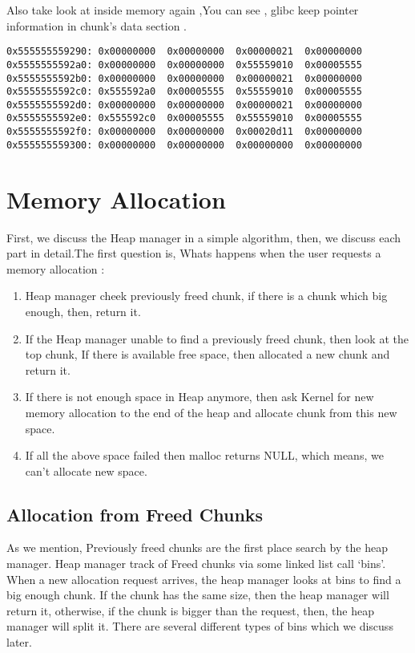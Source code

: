 \documentclass{masterthesis}
\newcommand*\libc{glibc}
\begin{document}
Also take look at inside memory again ,You can see , \libc{} keep pointer information in chunk's data section .
\begin{lstlisting}
0x555555559290:	0x00000000	0x00000000	0x00000021	0x00000000
0x5555555592a0:	0x00000000	0x00000000	0x55559010	0x00005555
0x5555555592b0:	0x00000000	0x00000000	0x00000021	0x00000000
0x5555555592c0:	0x555592a0	0x00005555	0x55559010	0x00005555
0x5555555592d0:	0x00000000	0x00000000	0x00000021	0x00000000
0x5555555592e0:	0x555592c0	0x00005555	0x55559010	0x00005555
0x5555555592f0:	0x00000000	0x00000000	0x00020d11	0x00000000
0x555555559300:	0x00000000	0x00000000	0x00000000	0x00000000
\end{lstlisting}
 
\section{Memory Allocation}
 First, we discuss the Heap manager in a simple algorithm, then, we discuss each part in detail.The first question is, Whats happens when the user requests a memory allocation : 
\begin{enumerate}
	\item Heap manager cheek previously freed chunk, if there is a chunk which big enough, then, return it.
	\item If the Heap manager unable to find a previously freed chunk, then look at the top chunk, If there is available free space, then allocated a new chunk and return it.
	\item If there is not enough space in Heap anymore, then ask Kernel for new memory allocation to the end of the heap and allocate chunk from this new space.
	\item If all the above space failed then malloc returns NULL, which means, we can’t allocate new space.
\end{enumerate}

\subsection{Allocation from Freed Chunks}
As we mention, Previously freed chunks are the first place search by the heap manager. Heap manager track of Freed chunks via some linked list call ‘bins’. When a new allocation request arrives, the heap manager looks at bins to find a big enough chunk. If the chunk has the same size, then the heap manager will return it, otherwise, if the chunk is bigger than the request, then, the heap manager will split it. There are several different types of bins which we discuss later.
\end{document}
